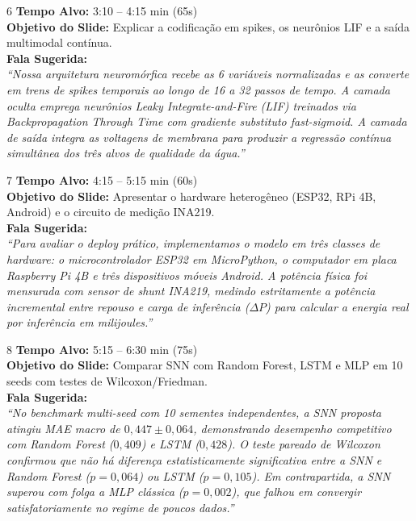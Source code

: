 \documentclass[11pt,a4paper]{article}
\begin{document}
\begin{slidebox}{6}
\textbf{Tempo Alvo:} 3:10 -- 4:15 min (65s)\\[3pt]
\textbf{Objetivo do Slide:} Explicar a codificação em spikes, os neurônios LIF e a saída multimodal contínua.\\[3pt]
\textbf{Fala Sugerida:}\\
\textit{``Nossa arquitetura neuromórfica recebe as 6 variáveis normalizadas e as converte em trens de spikes temporais ao longo de 16 a 32 passos de tempo. A camada oculta emprega neurônios Leaky Integrate-and-Fire (LIF) treinados via Backpropagation Through Time com gradiente substituto fast-sigmoid. A camada de saída integra as voltagens de membrana para produzir a regressão contínua simultânea dos três alvos de qualidade da água.''}
\end{slidebox}

\begin{slidebox}{7}
\textbf{Tempo Alvo:} 4:15 -- 5:15 min (60s)\\[3pt]
\textbf{Objetivo do Slide:} Apresentar o hardware heterogêneo (ESP32, RPi 4B, Android) e o circuito de medição INA219.\\[3pt]
\textbf{Fala Sugerida:}\\
\textit{``Para avaliar o deploy prático, implementamos o modelo em três classes de hardware: o microcontrolador ESP32 em MicroPython, o computador em placa Raspberry Pi 4B e três dispositivos móveis Android. A potência física foi mensurada com sensor de shunt INA219, medindo estritamente a potência incremental entre repouso e carga de inferência ($\Delta P$) para calcular a energia real por inferência em milijoules.''}
\end{slidebox}

\begin{slidebox}{8}
\textbf{Tempo Alvo:} 5:15 -- 6:30 min (75s)\\[3pt]
\textbf{Objetivo do Slide:} Comparar SNN com Random Forest, LSTM e MLP em 10 seeds com testes de Wilcoxon/Friedman.\\[3pt]
\textbf{Fala Sugerida:}\\
\textit{``No benchmark multi-seed com 10 sementes independentes, a SNN proposta atingiu MAE macro de $0{,}447 \pm 0{,}064$, demonstrando desempenho competitivo com Random Forest ($0{,}409$) e LSTM ($0{,}428$). O teste pareado de Wilcoxon confirmou que não há diferença estatisticamente significativa entre a SNN e Random Forest ($p=0{,}064$) ou LSTM ($p=0{,}105$). Em contrapartida, a SNN superou com folga a MLP clássica ($p=0{,}002$), que falhou em convergir satisfatoriamente no regime de poucos dados.''}
\end{slidebox}
\end{document}
